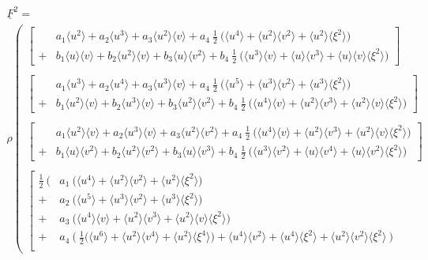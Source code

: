 \documentclass[
	pdftex,             %
	12pt,				%
	a4paper,		   	%
	english,				%
	oneside,			%
]{article}
\newcommand{\mom}[1]{\langle #1 \rangle}
\newcommand{\uu}[1]{\underline{#1}}
\begin{document}
\begin{math}
\begin{array}{l}
\uu{F}^2 
=
\\
\rho
\left(
\begin{array}{l}
\left[
\begin{array}{ll}
  & a_1 \mom{u^2} + 
    a_2 \mom{u^3} +
    a_3 \mom{u^2}\mom{v} +
    a_4 ~\tfrac{1}{2}~\big( \mom{u^4} + \mom{u^2}\mom{v^2} + \mom{u^2}\mom{\xi^2} \big)
\\	
+ & b_1 \mom{u}\mom{v} +
b_2 \mom{u^2}\mom{v} +
b_3 \mom{u}\mom{v^2} +
b_4 ~\tfrac{1}{2}~\big( \mom{u^3}\mom{v} + \mom{u}\mom{v^3} + \mom{u}\mom{v}\mom{\xi^2} \big)
\end{array}
\right]
\\ ~\\
\left[
\begin{array}{ll}
&
a_1 \mom{u^3} +
a_2 \mom{u^4} +
a_3 \mom{u^3}\mom{v} +
a_4 ~\tfrac{1}{2}~\big( \mom{u^5} + \mom{u^3}\mom{v^2} + \mom{u^3}\mom{\xi^2} \big)
\\	
+&
b_1 \mom{u^2}\mom{v} +
b_2 \mom{u^3}\mom{v}+
b_3 \mom{u^2}\mom{v^2}+
b_4 ~\tfrac{1}{2}~\big( \mom{u^4}\mom{v} + \mom{u^2}\mom{v^3} + \mom{u^2}\mom{v}\mom{\xi^2} \big)
\end{array}
\right]
\\ ~ \\
\left[
\begin{array}{ll}
&
a_1 \mom{u^2}\mom{v} +
a_2 \mom{u^3}\mom{v} +
a_3 \mom{u^2}\mom{v^2} +
a_4 ~\tfrac{1}{2}~\big( \mom{u^4}\mom{v} + \mom{u^2}\mom{v^3} + \mom{u^2}\mom{v}\mom{\xi^2} \big)
\\	
+ &
b_1 \mom{u}\mom{v^2} +
b_2 \mom{u^2}\mom{v^2}+
b_3 \mom{u}\mom{v^3}+
b_4 ~\tfrac{1}{2}~\big( \mom{u^3}\mom{v^2} + \mom{u}\mom{v^4} + \mom{u}\mom{v^2}\mom{\xi^2} \big)
\end{array}
\right]
\\ ~ \\
\left[
\begin{array}{ll}
\frac{1}{2} ~ \Big( 
   & a_1~ \big( \mom{u^4} + \mom{u^2}\mom{v^2} + \mom{u^2}\mom{\xi^2} \big) \\
 + & a_2~ \big( \mom{u^5} + \mom{u^3}\mom{v^2} + \mom{u^3}\mom{\xi^2} \big) \\
 + & a_3~ \big( \mom{u^4}\mom{v} + \mom{u^2}\mom{v^3} + \mom{u^2}\mom{v}\mom{\xi^2} \big) \\
 + & a_4~ \big(~ \tfrac{1}{2} \big( \mom{u^6} + \mom{u^2}\mom{v^4} + \mom{u^2}\mom{\xi^4} \big)
 				+ \mom{u^4}\mom{v^2} + \mom{u^4}\mom{\xi^2} + \mom{u^2}\mom{v^2}\mom{\xi^2} ~\big) \\

\end{array}
\end{array}
\end{array}
\end{math}
\end{document}
